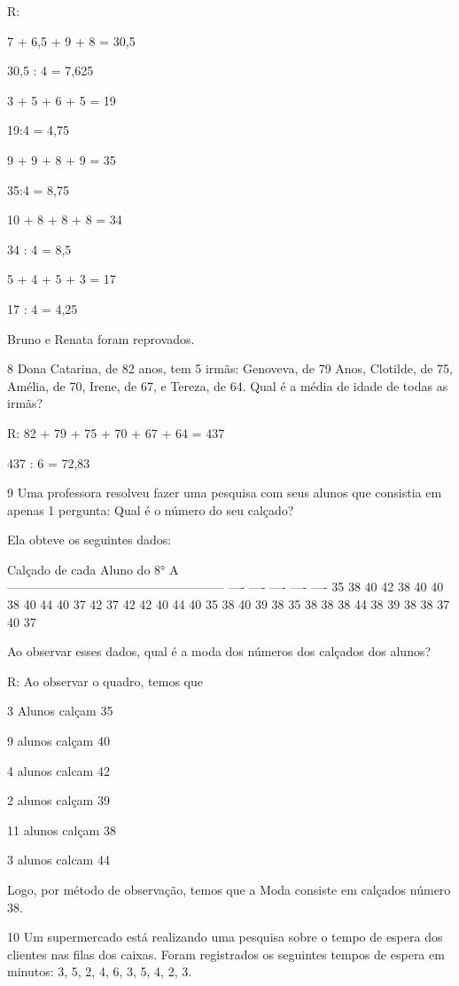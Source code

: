 {R:
\item

7 + 6,5 + 9 + 8 = 30,5

30,5 : 4 = 7,625
\item

3 + 5 + 6 + 5 = 19

19:4 = 4,75
\item 9 + 9 + 8 + 9 = 35

35:4 = 8,75
\item

10 + 8 + 8 + 8 = 34

34 : 4 = 8,5
\item

5 + 4 + 5 + 3 = 17

17 : 4 = 4,25
\item Bruno e Renata foram reprovados.

\num{8} Dona Catarina, de 82 anos, tem 5 irmãs: Genoveva, de 79 Anos,
Clotilde, de 75, Amélia, de 70, Irene, de 67, e Tereza, de 64. Qual é a
média de idade de todas as irmãs?

R: 82 + 79 + 75 + 70 + 67 + 64 = 437

437 : 6 = 72,83

\num{9} Uma professora resolveu fazer uma pesquisa com seus alunos que
consistia em apenas 1 pergunta: Qual é o número do seu calçado?

Ela obteve os seguintes dados:

Calçado de cada Aluno do 8° A\\
----------------------------------------------------- ---- ---- ----
---- ---- 35 38 40 42 38 40 40 38 40 44 40 37 42 37 42 42 40 44 40 35 38
40 39 38 35 38 38 38 44 38 39 38 38 37 40 37

Ao observar esses dados, qual é a moda dos números dos calçados dos
alunos?

R: Ao observar o quadro, temos que

3 Alunos calçam 35

9 alunos calçam 40

4 alunos calcam 42

2 alunos calçam 39

11 alunos calçam 38

3 alunos calcam 44

Logo, por método de observação, temos que a Moda consiste em calçados
número 38.

\num{10} Um supermercado está realizando uma pesquisa sobre o tempo de espera
dos clientes nas filas dos caixas. Foram registrados os seguintes tempos
de espera em minutos: 3, 5, 2, 4, 6, 3, 5, 4, 2, 3.

}
